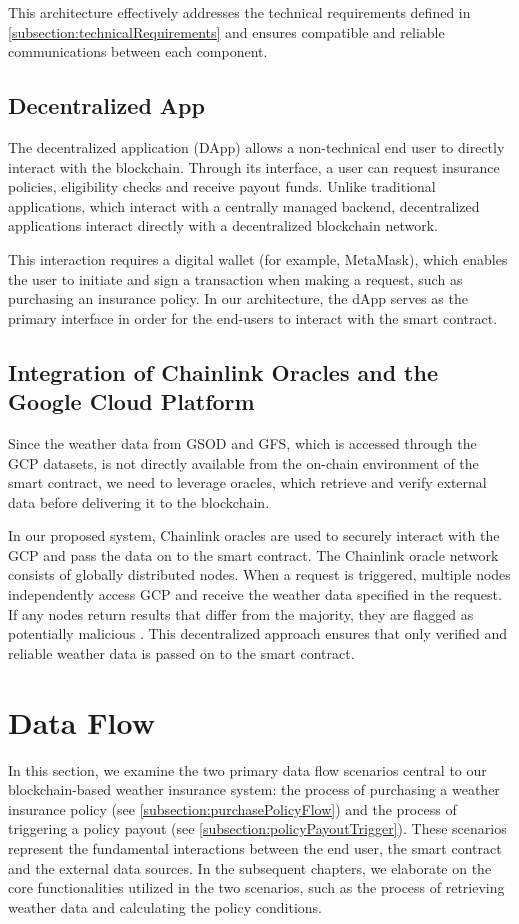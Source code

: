 This architecture effectively addresses the technical requirements defined in \cref{subsection:technicalRequirements} and ensures compatible and reliable communications between each component.

\subsection{Decentralized App}\label{subsection:decentralizedApp}
The decentralized application (DApp) allows a non-technical end user to directly interact with the blockchain. Through its interface, a user can request insurance policies, eligibility checks and receive payout funds. Unlike traditional applications, which interact with a centrally managed backend, decentralized applications interact directly with a decentralized blockchain network.

This interaction requires a digital wallet (for example, MetaMask), which enables the user to initiate and sign a transaction when making a request, such as purchasing an insurance policy. In our architecture, the dApp serves as the primary interface in order for the end-users to interact with the smart contract. 

\subsection{Integration of Chainlink Oracles and the Google Cloud Platform}\label{subsection:ChainlinkOracle}
Since the weather data from GSOD and GFS, which is accessed through the GCP datasets, is not directly available from the on-chain environment of the smart contract, we need to leverage oracles, which retrieve and verify external data before delivering it to the blockchain.

In our proposed system, Chainlink oracles are used to securely interact with the GCP and pass the data on to the smart contract. The Chainlink oracle network consists of globally distributed nodes. When a request is triggered, multiple nodes independently access GCP and receive the weather data specified in the request. If any nodes return results that differ from the majority, they are flagged as potentially malicious \autocite{goswami2022towards}. This decentralized approach ensures that only verified and reliable weather data is passed on to the smart contract.

\section{Data Flow}
In this section, we examine the two primary data flow scenarios central to our blockchain-based weather insurance system: the process of purchasing a weather insurance policy (see \cref{subsection:purchasePolicyFlow}) and the process of triggering a policy payout (see \cref{subsection:policyPayoutTrigger}). These scenarios represent the fundamental interactions between the end user, the smart contract and the external data sources. In the subsequent chapters, we elaborate on the core functionalities utilized in the two scenarios, such as the process of retrieving weather data and calculating the policy conditions.

